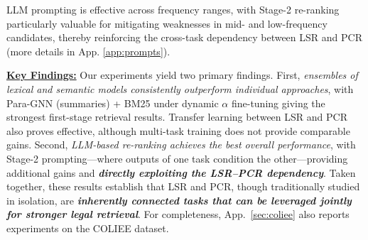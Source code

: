 \noindent LLM prompting is effective across frequency ranges, with Stage-2 re-ranking particularly valuable for mitigating weaknesses in mid- and low-frequency candidates, thereby reinforcing the cross-task dependency between LSR and PCR (more details in App. \ref{app:prompts}).

\vspace{1mm}
\noindent\underline{\textbf{Key Findings:}} 
Our experiments yield two primary findings. First, \textit{ensembles of lexical and semantic models consistently outperform individual approaches}, with Para-GNN (summaries) + BM25 under dynamic $\alpha$ fine-tuning giving the strongest first-stage retrieval results. Transfer learning between LSR and PCR also proves effective, although multi-task training does not provide comparable gains. Second, \textit{LLM-based re-ranking achieves the best overall performance}, with Stage-2 prompting---where outputs of one task condition the other---providing additional gains and \textbf{\textit{directly exploiting the LSR--PCR dependency}}. Taken together, these results establish that LSR and PCR, though traditionally studied in isolation, are \textbf{\textit{inherently connected tasks that can be leveraged jointly for stronger legal retrieval}}. For completeness, App.~\ref{sec:coliee} also reports experiments on the COLIEE dataset.


